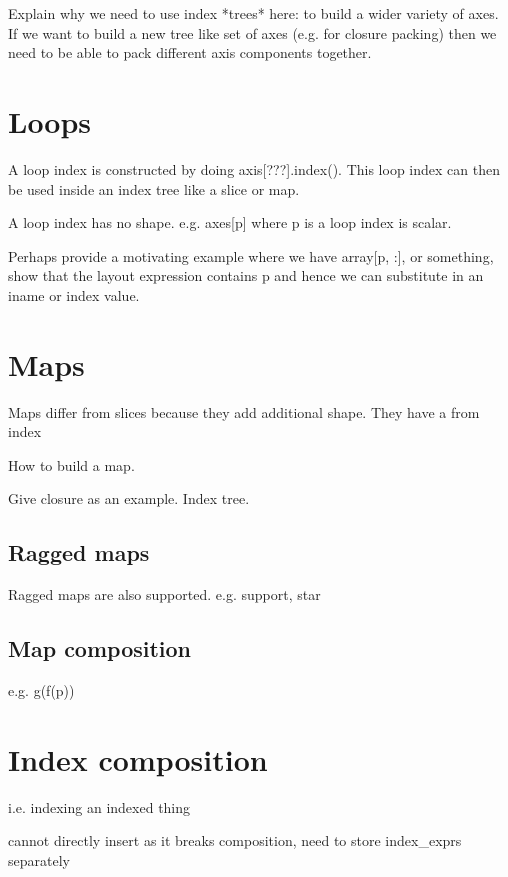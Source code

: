 \documentclass[thesis]{subfiles}
\begin{document}
Explain why we need to use index *trees* here: to build a wider variety of axes.
If we want to build a new tree like set of axes (e.g. for closure packing) then we need to be able to pack different axis components together.

\section{Loops}


A loop index is constructed by doing axis[???].index().
This loop index can then be used inside an index tree like a slice or map.

A loop index has no shape. e.g. axes[p] where p is a loop index is scalar.

Perhaps provide a motivating example where we have array[p, :], or something, show that the layout expression contains p and hence we can substitute in an iname or index value.

\section{Maps}

Maps differ from slices because they add additional shape. They have a from index

How to build a map.

Give closure as an example. Index tree.

\subsection{Ragged maps}

Ragged maps are also supported. e.g. support, star

\subsection{Map composition}

e.g. g(f(p))

\section{Index composition}

i.e. indexing an indexed thing


cannot directly insert as it breaks composition, need to store index\_exprs separately
\end{document}
